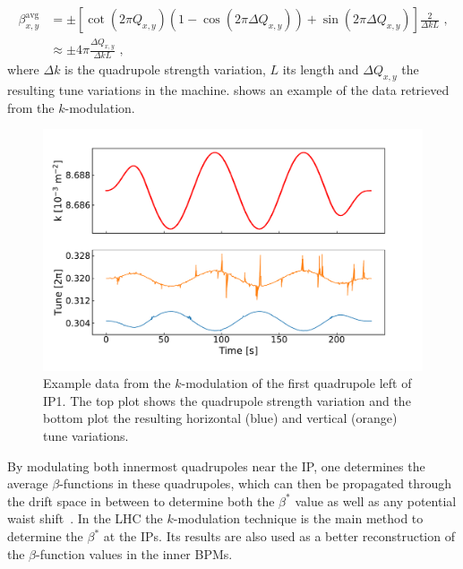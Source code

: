 \begin{equation}
  \begin{aligned}
    \beta^{\mathrm{avg}}_{x,y} & =\pm \left[ \cot \left(2 \pi Q_{x,y} \right) \left( 1 - \cos \left(2 \pi \Delta Q_{x,y} \right) \right) + \sin \left( 2 \pi \Delta Q_{x,y} \right) \right] \frac{2}{\Delta k L} \text{ ,}  \\
                               & \approx \pm 4 \pi \frac{\Delta Q_{x,y}}{\Delta k L} \text{ ,}
  \end{aligned}
  \label{equation:k_modulation_average_beta}
\end{equation}
where \(\Delta k\) is the quadrupole strength variation, \(L\) its length and \(\Delta Q_{x,y}\) the resulting tune variations in the machine.
 shows an example of the data retrieved from the \(k\)-modulation.

\begin{figure}[!htb]
  \centering
  \includegraphics*[width=0.99\linewidth]{Figures/Optics_Measurements_Corrections_at_LHC/k_modulation.pdf}
  \caption{Example data from the \(k\)-modulation of the first quadrupole left of IP\num{1}. The top plot shows the quadrupole strength variation and the bottom plot the resulting horizontal (\textcolor{mplblue}{blue}) and vertical (\textcolor{mplorange}{orange}) tune variations.}
  \label{figure:kmod_mqxa1l1}
\end{figure}

By modulating both innermost quadrupoles near the IP, one determines the average \(\beta\)-functions in these quadrupoles, which can then be propagated through the drift space in between to determine both the \(\beta^{\ast}\) value as well as any potential waist shift~\cite{PRAB:Carlier:K_Modulation_HL_LHC}.
In the LHC the \(k\)-modulation technique is the main method to determine the \(\beta^{\ast}\) at the \glspl{IP}.
Its results are also used as a better reconstruction of the \(\beta\)-function values in the inner BPMs.

